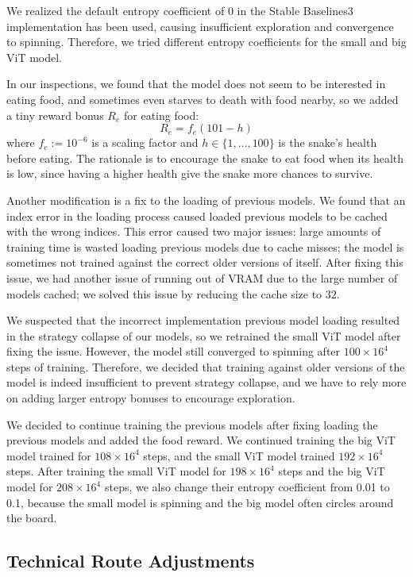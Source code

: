 \documentclass[conference]{IEEEtran}
\begin{document}
We realized the default entropy coefficient of 0 in the Stable Baselines3
implementation has been used,
causing insufficient exploration and convergence to spinning. Therefore,
we tried different entropy coefficients for the small and big ViT model.

In our inspections,
we found that the model does not seem to be interested in eating food,
and sometimes even starves to death with food nearby,
so we added a tiny reward bonus $R_e$ for eating food:
$$
    R_e = f_e(101 - h)
$$
where $f_e:=10^{-6}$ is a scaling factor and $h\in\{1,\ldots,100\}$ is the
snake's health before eating.
The rationale is to encourage the snake to eat food when its health is low,
since having a higher health give the snake more chances to survive.

Another modification is a fix to the loading of previous models.
We found that an index error in the loading process caused loaded previous
models to be cached with the wrong indices. This error caused two major issues:
large amounts of training time is wasted loading previous models due to cache
misses;
the model is sometimes not trained against the correct older versions of itself.
After fixing this issue,
we had another issue of running out of VRAM due to the large number of models
cached; we solved this issue by reducing the cache size to $32$.

We suspected that the incorrect implementation previous model loading resulted
in the strategy collapse of our models,
so we retrained the small ViT model after fixing the issue. However,
the model still converged to spinning after $100\times 16^4$ steps of training.
Therefore,
we decided that training against older versions of the model is indeed
insufficient to prevent strategy collapse,
and we have to rely more on adding larger entropy bonuses to encourage
exploration.

We decided to continue training the previous models after fixing loading the
previous models and added the food reward.
We continued training the big ViT model trained for $108\times 16^4$ steps,
and the small ViT model trained $192\times 16^4$ steps.
After training the small ViT model for $198\times 16^4$ steps and the big ViT
model for $208\times 16^4$ steps,
we also change their entropy coefficient from 0.01 to 0.1,
because the small model is spinning and the big model often circles around the
board.

\subsection{Technical Route Adjustments}
\end{document}
